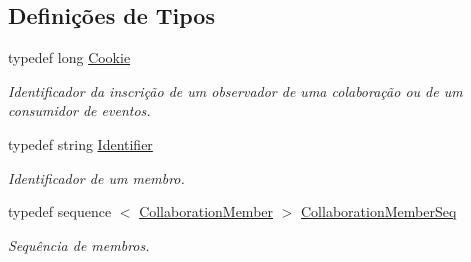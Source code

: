 \subsection*{\-Definições de \-Tipos}
\begin{DoxyCompactItemize}
\item 
\hypertarget{namespacetecgraf_1_1openbus_1_1services_1_1collaboration_1_1v1__0_a0ae94dd917c8ec58f4a7fcc2087064be}{typedef long \hyperlink{namespacetecgraf_1_1openbus_1_1services_1_1collaboration_1_1v1__0_a0ae94dd917c8ec58f4a7fcc2087064be}{\-Cookie}}\label{namespacetecgraf_1_1openbus_1_1services_1_1collaboration_1_1v1__0_a0ae94dd917c8ec58f4a7fcc2087064be}

\begin{DoxyCompactList}\small\item\em \-Identificador da inscrição de um observador de uma colaboração ou de um consumidor de eventos. \end{DoxyCompactList}\item 
\hypertarget{namespacetecgraf_1_1openbus_1_1services_1_1collaboration_1_1v1__0_a75ab61291da492f86a7ea465804c7e45}{typedef string \hyperlink{namespacetecgraf_1_1openbus_1_1services_1_1collaboration_1_1v1__0_a75ab61291da492f86a7ea465804c7e45}{\-Identifier}}\label{namespacetecgraf_1_1openbus_1_1services_1_1collaboration_1_1v1__0_a75ab61291da492f86a7ea465804c7e45}

\begin{DoxyCompactList}\small\item\em \-Identificador de um membro. \end{DoxyCompactList}\item 
\hypertarget{namespacetecgraf_1_1openbus_1_1services_1_1collaboration_1_1v1__0_ac42ccd44052fb5c923b4990ac5c76784}{typedef sequence\*
$<$ \hyperlink{structtecgraf_1_1openbus_1_1services_1_1collaboration_1_1v1__0_1_1CollaborationMember}{\-Collaboration\-Member} $>$ \hyperlink{namespacetecgraf_1_1openbus_1_1services_1_1collaboration_1_1v1__0_ac42ccd44052fb5c923b4990ac5c76784}{\-Collaboration\-Member\-Seq}}\label{namespacetecgraf_1_1openbus_1_1services_1_1collaboration_1_1v1__0_ac42ccd44052fb5c923b4990ac5c76784}

\begin{DoxyCompactList}\small\item\em \-Sequência de membros. \end{DoxyCompactList}\end{DoxyCompactItemize}

